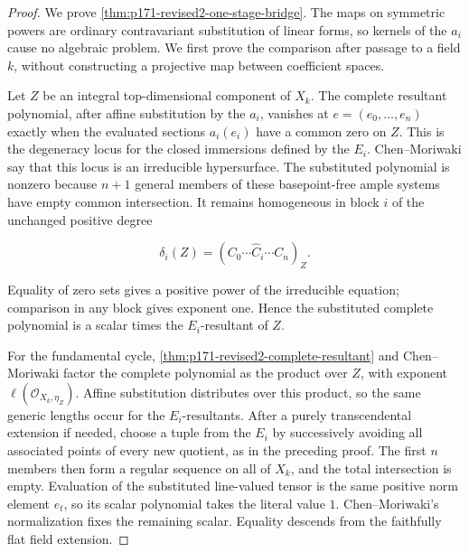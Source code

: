 \begin{proof}
We prove \cref{thm:p171-revised2-one-stage-bridge}.  The maps on
symmetric powers are ordinary contravariant substitution of linear forms,
so kernels of the \(a_i\) cause no algebraic problem.  We first prove the
comparison after passage to a field \(k\), without constructing a
projective map between coefficient spaces.

Let \(Z\) be an integral top-dimensional component of \(X_k\).  The
complete resultant polynomial, after affine substitution by the \(a_i\),
vanishes at \(e=(e_0,\ldots,e_n)\) exactly when the evaluated sections
\(a_i(e_i)\) have a common zero on \(Z\).  This is the degeneracy locus for
the closed immersions defined by the \(E_i\).  Chen--Moriwaki
\cite[Proposition~1.6.2 and Definition~1.6.3]{ChenMoriwaki21AdelicIntersection}
say that this locus is an irreducible
hypersurface.  The substituted polynomial is nonzero because \(n+1\)
general members of these basepoint-free ample systems have empty common
intersection.  It remains homogeneous in block \(i\) of the unchanged
positive degree

\[
 \delta_i(Z)=(C_0\cdots\widehat C_i\cdots C_n)_Z.
\]

Equality of zero sets gives a positive power of the irreducible equation;
comparison in any block gives exponent one.  Hence the substituted complete
polynomial is a scalar times the \(E_i\)-resultant of \(Z\).

For the fundamental cycle,
\cref{thm:p171-revised2-complete-resultant} and Chen--Moriwaki
\cite[Definition~1.6.3]{ChenMoriwaki21AdelicIntersection} factor the
complete polynomial as the product over \(Z\),
with exponent \(\ell(\mathcal O_{X_k,\eta_Z})\).  Affine substitution
distributes over this product, so the same generic lengths occur for the
\(E_i\)-resultants.  After a purely transcendental extension if needed,
choose a tuple from the \(E_i\) by successively avoiding all associated
points of every new quotient, as in the preceding proof.  The first \(n\)
members then form a regular sequence on all of \(X_k\), and the total
intersection is empty.  Evaluation of the substituted line-valued tensor
is the same positive norm element \(e_t\), so its scalar polynomial takes
the literal value \(1\).  Chen--Moriwaki's normalization
\cite[Definition~1.6.7]{ChenMoriwaki21AdelicIntersection} fixes the remaining
scalar.  Equality descends from the faithfully flat field extension.


\end{proof}
